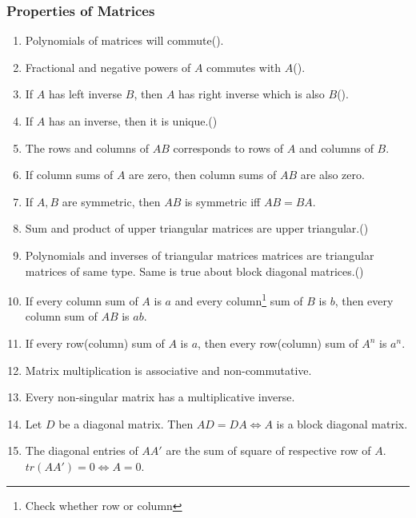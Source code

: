 \subsubsection{Properties of Matrices}
\begin{enumerate}
	\item Polynomials of matrices will commute(\citeauthor{charu}). %
	\item Fractional and negative powers of $A$ commutes with $A$(\citeauthor{charu}).
	\item If $A$ has left inverse $B$, then $A$ has right inverse which is also $B$(\citeauthor{charu}).%
	\item If $A$ has an inverse, then it is unique.(\citeauthor{charu})
	\item The rows and columns of $AB$ corresponds to rows of $A$ and columns of $B$.
	\item If column sums of $A$ are zero, then column sums of $AB$ are also zero.
	\item If $A,B$ are symmetric, then $AB$ is symmetric iff $AB = BA$. %
	\item Sum and product of upper triangular matrices are upper triangular.(\citeauthor{charu})
	\item Polynomials and inverses of triangular matrices matrices are triangular matrices of same type. Same is true about block diagonal matrices.(\citeauthor{charu})
	\item If every column sum of $A$ is $a$ and every column\footnote{Check whether row or column} sum of $B$ is $b$, then every column sum of $AB$ is $ab$.
	\item If every row(column) sum of $A$ is $a$, then every row(column) sum of $A^n$ is $a^n$.
	\item Matrix multiplication is associative and non-commutative.
	\item Every non-singular matrix has a multiplicative inverse.
	\item Let $D$ be a diagonal matrix.
	Then $AD = DA \iff A$ is a block diagonal matrix.
	\item The diagonal entries of $AA'$ are the sum of square of respective row of $A$.
		\subitem $tr(AA') = 0 \iff A = 0$.
\end{enumerate}

